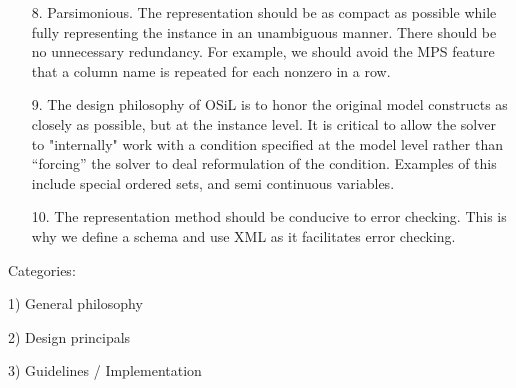 \documentclass[11pt]{amsart}
\begin{document}
\begin{itemize}
\item[8.]  Parsimonious. The representation should be as compact as possible while fully representing the instance in an unambiguous manner.  There should be no unnecessary redundancy. For example, we should avoid the MPS feature that a column name is repeated for each nonzero in a row.

\item[9.]  The design philosophy of OSiL is to honor the original model constructs as closely as possible, but at the instance level.  It is critical to  allow the solver to "internally"  work with a  condition specified at the model level  rather than ``forcing'' the solver to  deal reformulation of the condition. Examples of this include special ordered sets, and semi continuous variables.  

\item[10.] The representation method should be conducive to error checking. This is why we define a schema and use XML as it facilitates error checking. 



\end{itemize}

Categories:

1) General philosophy

2) Design principals 

3) Guidelines / Implementation
\end{document}
